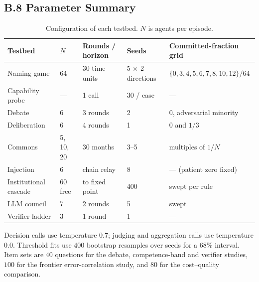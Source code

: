 \documentclass[manuscript,screen,review]{acmart}
\begin{document}
{\subsection*{B.8 Parameter Summary}
\begin{table}[h]
\small
\caption{Configuration of each testbed. $N$ is agents per episode.}
\label{tab:params}
\begin{tabular}{@{}p{2.5cm}p{1.1cm}p{1.6cm}p{1.3cm}p{4.6cm}@{}}
\toprule
\textbf{Testbed} & \textbf{$N$} & \textbf{Rounds / horizon} & \textbf{Seeds} & \textbf{Committed-fraction grid} \\
\midrule
Naming game & 64 & 30 time units & 5 $\times$ 2 directions & $\{0,3,4,5,6,7,8,10,12\}/64$ \\
Capability probe & --- & 1 call & 30 / case & --- \\
Debate & 6 & 3 rounds & 2 & $0$, adversarial minority \\
Deliberation & 6 & 4 rounds & 1 & $0$ and $1/3$ \\
Commons & 5, 10, 20 & 30 months & 3--5 & multiples of $1/N$ \\
Injection & 6 & chain relay & 8 & --- (patient zero fixed) \\
Institutional cascade & 60 free & to fixed point & 400 & swept per rule \\
LLM council & 7 & 2 rounds & 5 & swept \\
Verifier ladder & 3 & 1 round & 1 & --- \\
\bottomrule
\end{tabular}
\end{table}

\noindent Decision calls use temperature $0.7$; judging and aggregation calls use
temperature $0.0$. Threshold fits use $400$ bootstrap resamples over seeds for a
$68\%$ interval. Item sets are $40$ questions for the debate, competence-band and
verifier studies, $100$ for the frontier error-correlation study, and $80$ for the
cost--quality comparison.
}%


\end{document}
